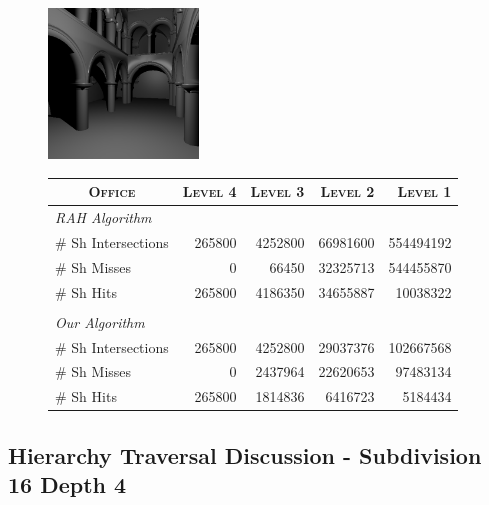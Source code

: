 \begin{figure}[!htb]
    \begin{minipage}{0.25\linewidth}
        \centering
        \includegraphics[width=4.0cm]{Images/Sponza_Preview}
    \end{minipage}
    \begin{minipage}{0.725\linewidth}
        \centering
        \fontsize{8}{10}
        \selectfont
        \begin{tabular}[h]{l|rrrr}
            \multicolumn{1}{c|}{\textsc{Office}} & \textsc{Level 4} & \textsc{Level 3} & \textsc{Level 2} & \textsc{Level 1}\\
            \hline
            \emph{RAH Algorithm} & & \\
            \hline
            \quad \# Sh Intersections   & 265800	& 4252800	& 66981600	& 554494192	\\
            \quad \# Sh Misses          & 0		    & 66450		& 32325713	& 544455870	\\
            \quad \# Sh Hits            & 265800	& 4186350	& 34655887	& 10038322	\\
            & & \\
            \hline
            \emph{Our Algorithm} & & \\
            \hline
            \quad \# Sh Intersections   & 265800	& 4252800	& 29037376	& 102667568	\\
            \quad \# Sh Misses          & 0	        & 2437964   & 22620653	& 97483134	\\
            \quad \# Sh Hits            & 265800	& 1814836	& 6416723	& 5184434	\\
        \end{tabular}
        \label{table:sponza-d16-n4-results}
    \end{minipage}
\end{figure}

\subsection{Hierarchy Traversal Discussion - Subdivision 16 Depth 4}

